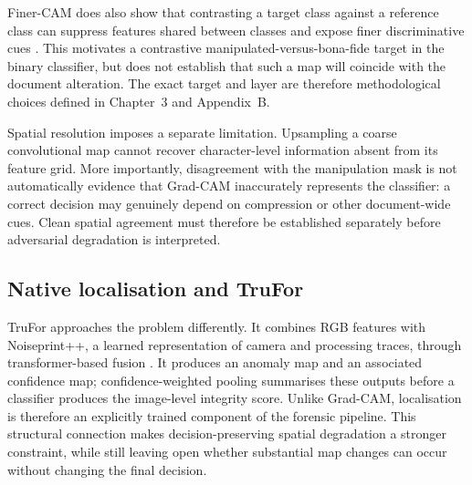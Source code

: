 
Finer-CAM does also show that contrasting a target class against a reference class can suppress features shared between classes and expose finer discriminative cues \citep{zhang2025finercam}. This motivates a contrastive manipulated-versus-bona-fide target in the binary classifier, but does not establish that such a map will coincide with the document alteration. The exact target and layer are therefore methodological choices defined in Chapter~3 and Appendix~B.

Spatial resolution imposes a separate limitation. Upsampling a coarse convolutional map cannot recover character-level information absent from its feature grid. More importantly, disagreement with the manipulation mask is not automatically evidence that Grad-CAM inaccurately represents the classifier: a correct decision may genuinely depend on compression or other document-wide cues. Clean spatial agreement must therefore be established separately before adversarial degradation is interpreted.

\subsection{Native localisation and TruFor}

TruFor approaches the problem differently. It combines RGB features with Noiseprint++, a learned representation of camera and processing traces, through transformer-based fusion \citep{guillaro2023trufor}. It produces an anomaly map and an associated confidence map; confidence-weighted pooling summarises these outputs before a classifier produces the image-level integrity score. Unlike Grad-CAM, localisation is therefore an explicitly trained component of the forensic pipeline. This structural connection makes decision-preserving spatial degradation a stronger constraint, while still leaving open whether substantial map changes can occur without changing the final decision.

